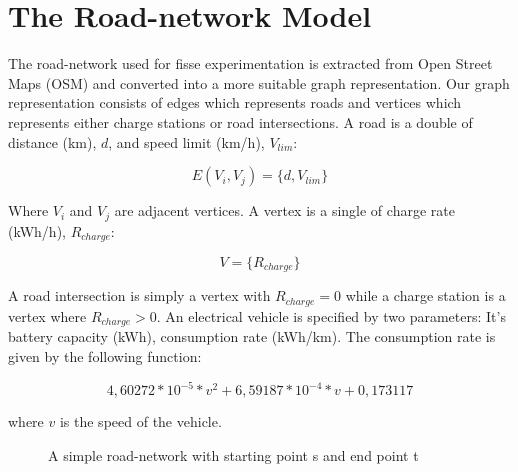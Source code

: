 \section{The Road-network Model}

The road-network used for fisse experimentation is extracted
from Open Street Maps (OSM) and converted into a more suitable 
graph representation. Our graph representation consists 
of edges which represents roads and vertices which represents 
either charge stations or road intersections. A road is 
a double of distance (km), $d$, and speed limit (km/h), 
$V_{lim}$:

\[E(V_i, V_j) = \{d, V_{lim}\} \]

Where $V_i$ and $V_j$ are adjacent vertices. A vertex is a 
single of charge rate (kWh/h), $R_{charge}$:

\[V = \{R_{charge}\} \]

A road intersection is simply a vertex with $R_{charge} = 0$
while a charge station is a vertex where $R_{charge} > 0$. 
An electrical vehicle is specified by two parameters: It's 
battery capacity (kWh), consumption rate (kWh/km). The 
consumption rate is given by the following function:

\[ 4,60272*10^{-5}*v^2+6,59187*10^{-4}*v+0,173117 \]

where $v$ is the speed of the vehicle. 

\begin{figure}
\label{figure:simpleroad-network}
\caption{A simple road-network with starting point s and end point t}
\end{figure}
